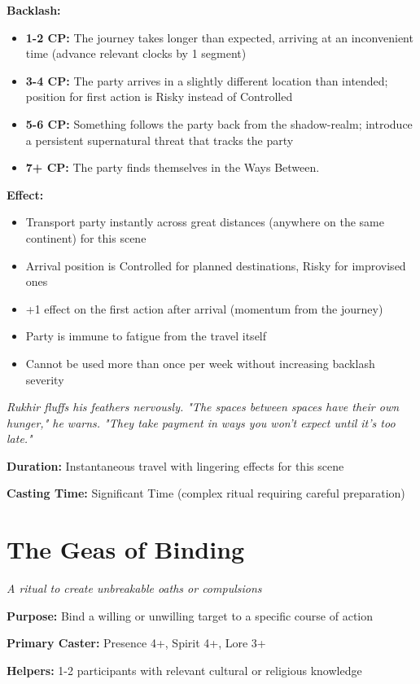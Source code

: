 \documentclass[12pt,twoside]{book}
\newcommand{\shadow}[1]{\textit{#1}}
\begin{document}
\textbf{Backlash:}
\begin{itemize}
\item \textbf{1-2 CP:} The journey takes longer than expected, arriving at an inconvenient time (advance relevant clocks by 1 segment)
\item \textbf{3-4 CP:} The party arrives in a slightly different location than intended; position for first action is Risky instead of Controlled
\item \textbf{5-6 CP:} Something follows the party back from the shadow-realm; introduce a persistent supernatural threat that tracks the party
\item \textbf{7+ CP:} The party finds themselves in the Ways Between.
\end{itemize}

\textbf{Effect:}
\begin{itemize}
\item Transport party instantly across great distances (anywhere on the same continent) for this scene
\item Arrival position is Controlled for planned destinations, Risky for improvised ones
\item +1 effect on the first action after arrival (momentum from the journey)
\item Party is immune to fatigue from the travel itself
\item Cannot be used more than once per week without increasing backlash severity
\end{itemize}

\shadow{Rukhir fluffs his feathers nervously. "The spaces between spaces have their own hunger," he warns. "They take payment in ways you won't expect until it's too late."}

\textbf{Duration:} Instantaneous travel with lingering effects for this scene

\textbf{Casting Time:} Significant Time (complex ritual requiring careful preparation)

\section*{The Geas of Binding}
\textit{A ritual to create unbreakable oaths or compulsions}

\textbf{Purpose:} Bind a willing or unwilling target to a specific course of action

\textbf{Primary Caster:} Presence 4+, Spirit 4+, Lore 3+

\textbf{Helpers:} 1-2 participants with relevant cultural or religious knowledge
\end{document}
